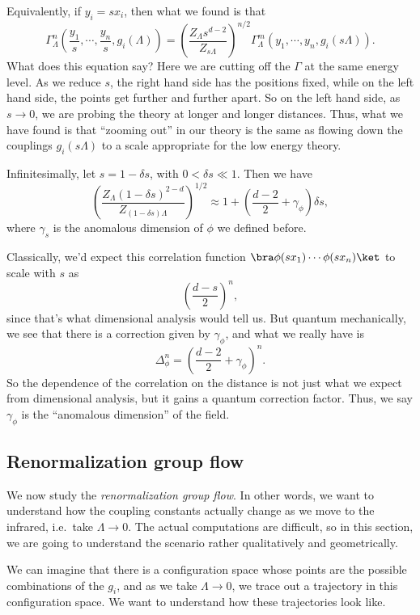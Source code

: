 \documentclass[a4paper]{article}
\begin{document}
Equivalently, if $y_i = sx_i$, then what we found is that
\[
  \Gamma_\Lambda^n \left(\frac{y_1}{s}, \cdots, \frac{y_n}{s}, g_i(\Lambda)\right) = \left(\frac{Z_\Lambda s^{d - 2}}{Z_{s\Lambda}}\right)^{n/2} \Gamma_\Lambda^m (y_1, \cdots, y_n, g_i(s\Lambda)).
\]
What does this equation say? Here we are cutting off the $\Gamma$ at the same energy level. As we reduce $s$, the right hand side has the positions fixed, while on the left hand side, the points get further and further apart. So on the left hand side, as $s \to 0$, we are probing the theory at longer and longer distances. Thus, what we have found is that ``zooming out'' in our theory is the same as flowing down the couplings $g_i(s\Lambda)$ to a scale appropriate for the low energy theory.

Infinitesimally, let $s = 1 - \delta s$, with $0 < \delta s \ll 1$. Then we have
\[
  \left(\frac{Z_\Lambda(1 - \delta s)^{2 - d}}{Z_{(1 - \delta s)\Lambda}}\right)^{1/2} \approx 1 + \left(\frac{d - 2}{2} + \gamma_\phi\right) \delta s,
\]
where $\gamma_s$ is the anomalous dimension of $\phi$ we defined before.

Classically, we'd expect this correlation function $ \bra \phi(s x_1) \cdots \phi(s x_n)\ket$ to scale with $s$ as
\[
  \left(\frac{d - s}{2}\right)^n,
\]
since that's what dimensional analysis would tell us. But quantum mechanically, we see that there is a correction given by $\gamma_\phi$, and what we really have is
\[
  \Delta_\phi^n = \left(\frac{d - 2}{2} + \gamma_\phi\right)^n.
\]
So the dependence of the correlation on the distance is not just what we expect from dimensional analysis, but it gains a quantum correction factor. Thus, we say $\gamma_\phi$ is the ``anomalous dimension'' of the field.

\subsection{Renormalization group flow}
We now study the \emph{renormalization group flow}. In other words, we want to understand how the coupling constants actually change as we move to the infrared, i.e.\ take $\Lambda \to 0$. The actual computations are difficult, so in this section, we are going to understand the scenario rather qualitatively and geometrically.

We can imagine that there is a configuration space whose points are the possible combinations of the $g_i$, and as we take $\Lambda \to 0$, we trace out a trajectory in this configuration space. We want to understand how these trajectories look like.
\end{document}
